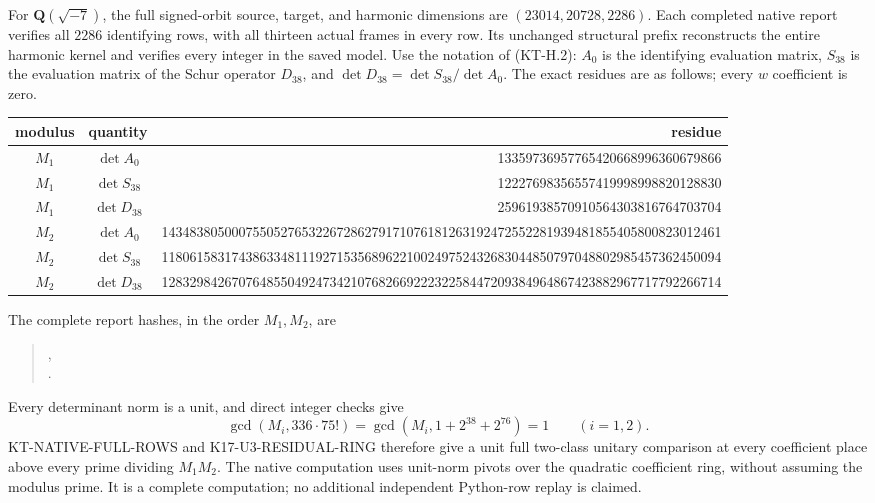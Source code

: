 For $\mathbf Q(\sqrt{-7})$, the full signed-orbit source, target,
and harmonic dimensions are $(23014,20728,2286)$.
Each completed native report verifies all $2286$ identifying
rows, with all thirteen actual frames in every row.  Its
unchanged structural prefix reconstructs the entire harmonic
kernel and verifies every integer in the saved model.
Use the notation of (KT-H.2): $A_0$ is the identifying
evaluation matrix, $S_{38}$ is the evaluation matrix of the
Schur operator $D_{38}$, and
$\det D_{38}=\det S_{38}/\det A_0$.
The exact residues are as follows; every $w$ coefficient is zero.
\begin{center}\scriptsize\setlength{\tabcolsep}{4pt}
\begin{tabular}{c|c|r}
modulus&quantity&residue\\\hline
$M_1$&$\det A_0$&13359736957765420668996360679866\\
$M_1$&$\det S_{38}$&12227698356557419998998820128830\\
$M_1$&$\det D_{38}$&25961938570910564303816764703704\\
$M_2$&$\det A_0$&14348380500075505276532267286279171076181263192472552281939481855405800823012461\\
$M_2$&$\det S_{38}$&11806158317438633481119271535689622100249752432683044850797048802985457362450094\\
$M_2$&$\det D_{38}$&12832984267076485504924734210768266922232258447209384964867423882967717792266714
\end{tabular}
\end{center}
The complete report hashes, in the order $M_1,M_2$, are
\begin{quote}\small
{},\\
.
\end{quote}
Every determinant norm is a unit, and direct integer checks give
\[
 \gcd(M_i,336\cdot75!)=
 \gcd(M_i,1+2^{38}+2^{76})=1\qquad(i=1,2).                \tag{KF38.4}
\]
KT-NATIVE-FULL-ROWS and K17-U3-RESIDUAL-RING therefore give
a unit full two-class unitary comparison at every coefficient
place above every prime dividing $M_1M_2$.  The native
computation uses unit-norm pivots over the quadratic coefficient
ring, without assuming the modulus prime.  It is a complete
computation; no additional independent Python-row replay is
claimed.

